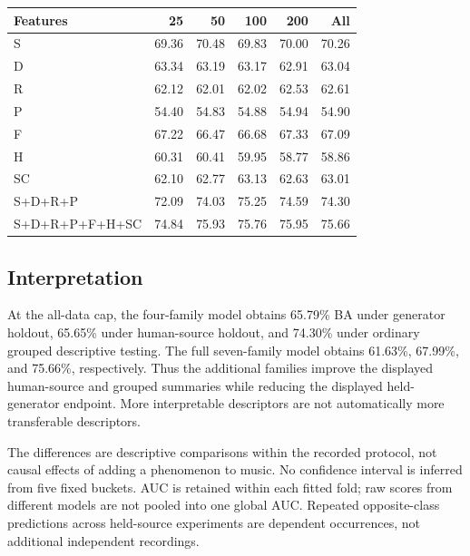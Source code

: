 \begin{center}\small

\begin{tabular}{lrrrrr}\toprule

Features & 25 & 50 & 100 & 200 & All \\ \midrule

S & 69.36 & 70.48 & 69.83 & 70.00 & 70.26 \\

D & 63.34 & 63.19 & 63.17 & 62.91 & 63.04 \\

R & 62.12 & 62.01 & 62.02 & 62.53 & 62.61 \\

P & 54.40 & 54.83 & 54.88 & 54.94 & 54.90 \\

F & 67.22 & 66.47 & 66.68 & 67.33 & 67.09 \\

H & 60.31 & 60.41 & 59.95 & 58.77 & 58.86 \\

SC & 62.10 & 62.77 & 63.13 & 62.63 & 63.01 \\

S+D+R+P & 72.09 & 74.03 & 75.25 & 74.59 & 74.30 \\

S+D+R+P+F+H+SC & 74.84 & 75.93 & 75.76 & 75.95 & 75.66 \\

\bottomrule\end{tabular}\end{center}

\subsection{Interpretation}

At the all-data cap, the four-family model obtains 65.79\% BA under generator holdout, 65.65\% under human-source holdout, and 74.30\% under ordinary grouped descriptive testing. The full seven-family model obtains 61.63\%, 67.99\%, and 75.66\%, respectively. Thus the additional families improve the displayed human-source and grouped summaries while reducing the displayed held-generator endpoint. More interpretable descriptors are not automatically more transferable descriptors.

The differences are descriptive comparisons within the recorded protocol, not causal effects of adding a phenomenon to music. No confidence interval is inferred from five fixed buckets. AUC is retained within each fitted fold; raw scores from different models are not pooled into one global AUC. Repeated opposite-class predictions across held-source experiments are dependent occurrences, not additional independent recordings.

